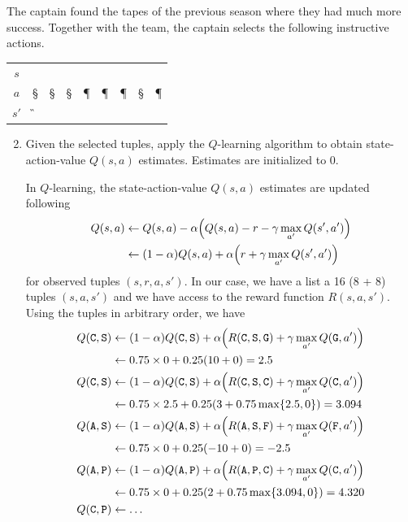 \documentclass[11pt, a4paper]{article}
\begin{document}
The captain found the tapes of the previous season where they had much more success. Together with the team, the captain selects the following instructive actions.

\begin{table}[h]
    \centering
    \begin{tabular}{c|cccccccc}
        \toprule
         $s$ & \C & \C & \A & \A & \C & \A & \A & \C \\
         $a$ & \S & \S & \S & \P & \P & \P & \S & \P \\
         $s'$ & \G & \C & \F & \C & \C & \C & \F & \F \\
         \bottomrule
    \end{tabular}
\end{table}

\begin{enumerate}
    \setcounter{enumi}{1}
    \item Given the selected tuples, apply the $Q$-learning algorithm to obtain state-action-value $Q(s, a)$ estimates. Estimates are initialized to 0.

    \begin{solution}
        In $Q$-learning, the state-action-value $Q(s, a)$ estimates are updated following
        \begin{align*}
            Q(s, a) & \gets Q(s, a) - \alpha \rbk*{Q(s, a) - r - \gamma \max_{a'} Q(s', a')} \\
            & \gets (1 - \alpha) Q(s, a) + \alpha \rbk*{r + \gamma \max_{a'} Q(s', a')}
        \end{align*}
        for observed tuples $(s, r, a, s')$. In our case, we have a list a 16 (8 + 8) tuples $(s, a, s')$ and we have access to the reward function $R(s, a, s')$. Using the tuples in arbitrary order, we have
        \begin{align*}
            Q(\C, \S) & \gets (1 - \alpha) Q(\C, \S) + \alpha \rbk*{R(\C, \S, \G) + \gamma \max_{a'} Q(\G, a')} \\
            & \gets 0.75 \times 0 + 0.25 \rbk{10 + 0} = 2.5 \\
            Q(\C, \S) & \gets (1 - \alpha) Q(\C, \S) + \alpha \rbk*{R(\C, \S, \C) + \gamma \max_{a'} Q(\C, a')} \\
            & \gets 0.75 \times 2.5 + 0.25 \rbk{3 + 0.75 \max \cbk{2.5, 0}} = 3.094 \\
            Q(\A, \S) & \gets (1 - \alpha) Q(\A, \S) + \alpha \rbk*{R(\A, \S, \F) + \gamma \max_{a'} Q(\F, a')} \\
            & \gets 0.75 \times 0 + 0.25 \rbk{-10 + 0} = -2.5 \\
            Q(\A, \P) & \gets (1 - \alpha) Q(\A, \P) + \alpha \rbk*{R(\A, \P, \C) + \gamma \max_{a'} Q(\C, a')} \\
            & \gets 0.75 \times 0 + 0.25 \rbk{2 + 0.75 \max \cbk{3.094, 0}} = 4.320 \\
            Q(\C, \P) & \gets \dots
        \end{align*}
    \end{solution}


\end{enumerate}
\end{document}
